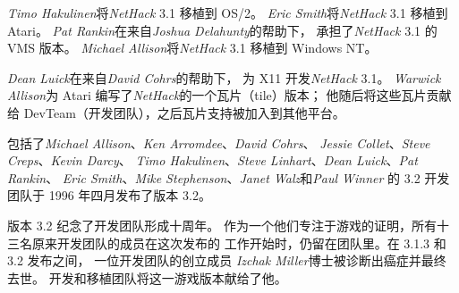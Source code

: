 \documentclass[a4paper, 10pt]{article}
\newcommand{\nd}{\noindent}
\begin{document}
\medskip
{\it Timo Hakulinen\/}将{\it NetHack\/} 3.1 移植到 OS/2。
{\it Eric Smith\/}将{\it NetHack\/} 3.1 移植到 Atari。
{\it Pat Rankin}在来自{\it Joshua Delahunty}的帮助下，
承担了{\it NetHack\/} 3.1 的 VMS 版本。
{\it Michael Allison}将{\it NetHack\/} 3.1 移植到 Windows NT。

\medskip
{\it Dean Luick}在来自{\it David Cohrs}的帮助下，
为 X11 开发{\it NetHack\/} 3.1。
{\it Warwick Allison}为 Atari 编写了{\it NetHack\/}的一个瓦片（tile）版本；
他随后将这些瓦片贡献给 DevTeam（开发团队），之后瓦片支持被加入到其他平台。

\medskip
包括了{\it Michael Allison}、{\it Ken Arromdee}、{\it David Cohrs}、
{\it Jessie Collet}、{\it Steve Creps}、{\it Kevin Darcy}、
{\it Timo Hakulinen}、{\it Steve Linhart}、{\it Dean Luick}、{\it Pat Rankin}、
{\it Eric Smith}、{\it Mike Stephenson}、{\it Janet Walz}和{\it Paul Winner}
的 3.2 开发团队于 1996 年四月发布了版本 3.2。

\medskip
版本 3.2 纪念了开发团队形成十周年。
作为一个他们专注于游戏的证明，所有十三名原来开发团队的成员在这次发布的
工作开始时，仍留在团队里。在 3.1.3 和 3.2 发布之间，
一位开发团队的创立成员 {\it Izchak Miller}博士被诊断出癌症并最终去世。
开发和移植团队将这一游戏版本献给了他。
\end{document}
